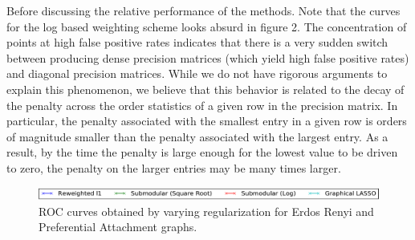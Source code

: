 \documentclass{uwstat572}
\theoremstyle{remark}
\theoremstyle{definition}
\begin{document}
Before discussing the relative performance of the methods.  Note that the curves for the log based weighting scheme looks absurd in figure 2.  The concentration of points at high false positive rates indicates that there is a very sudden switch between producing dense precision matrices (which yield high false positive rates) and diagonal precision matrices.  While we do not have rigorous arguments to explain this phenomenon, we believe that this behavior is related to the decay of the penalty across the order statistics of a given row in the precision matrix.  In particular, the penalty associated with the smallest entry in a given row is orders of magnitude smaller than the penalty associated with the largest entry.  As a result, by the time the penalty is large enough for the lowest value to be driven to zero, the penalty on the larger entries may be many times larger.

\begin{figure}
\centering
\includegraphics[width=1.0\linewidth]{legend.pdf}


\caption{ROC curves obtained by varying regularization for Erdos Renyi and Preferential Attachment graphs.}
\label{fig:parampart}
\end{figure}
\end{document}

